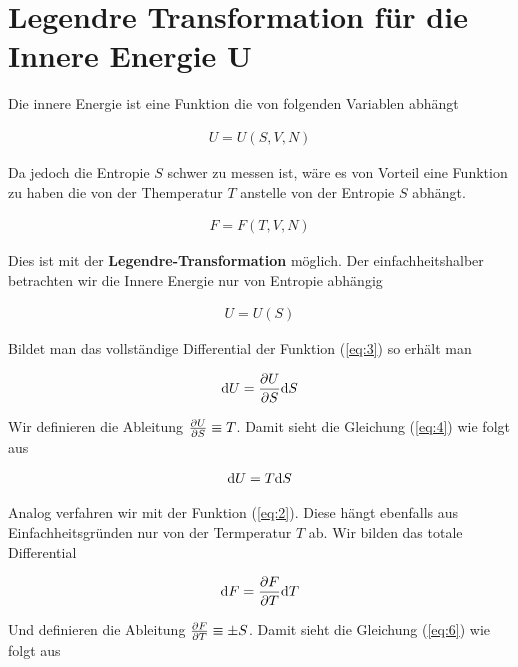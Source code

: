 
\usepackage{amsmath} 






\section*{Legendre Transformation für die Innere Energie U}


Die innere Energie ist eine Funktion die von folgenden Variablen abhängt

\begin{align}
  \label{eq:1}
  U=U(S,V,N)
\end{align}

Da jedoch die Entropie \(S\) schwer zu messen ist, wäre es von Vorteil eine Funktion zu haben die von der Themperatur \(T\) anstelle von der Entropie \(S\) abhängt.

\begin{align}
  \label{eq:2}
  F=F(T,V,N)
\end{align}

Dies ist mit der \textbf{Legendre-Transformation} möglich. Der einfachheitshalber betrachten wir die Innere Energie nur von Entropie abhängig

\begin{align}
  \label{eq:3}
  U = U(S) 
\end{align}

Bildet man das vollständige Differential der Funktion (\ref{eq:3}) so erhält man

\begin{align}
  \label{eq:4}
  \diff U = \pdiff U_S \diff S
\end{align}

Wir definieren die Ableitung \(\pdiff U_S\equiv T\). Damit sieht die Gleichung (\ref{eq:4}) wie folgt aus

\begin{align}
  \label{eq:5}
  \diff U = T \diff S
\end{align}

Analog verfahren wir mit der Funktion (\ref{eq:2}). Diese hängt ebenfalls aus Einfachheitsgründen nur von der Termperatur \(T\) ab. Wir bilden das totale Differential

\begin{align}
  \label{eq:6}
  \diff F = \pdiff F_T \diff T
\end{align}

Und definieren die Ableitung \(\pdiff F_T\equiv \pm S\). Damit sieht die Gleichung (\ref{eq:6}) wie folgt aus

